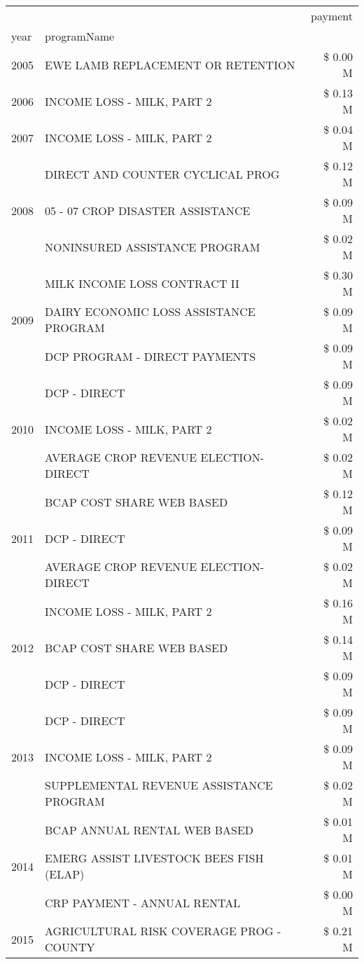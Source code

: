 \begin{tabular}{llr}
\toprule
 &  & payment \\
year & programName &  \\
\midrule
2005 & EWE LAMB REPLACEMENT OR RETENTION & \$ 0.00 M \\
\cline{1-3}
2006 & INCOME LOSS - MILK, PART 2 & \$ 0.13 M \\
\cline{1-3}
2007 & INCOME LOSS - MILK, PART 2 & \$ 0.04 M \\
\cline{1-3}
\multirow[t]{3}{*}{2008} & DIRECT AND COUNTER CYCLICAL PROG & \$ 0.12 M \\
 & 05 - 07 CROP DISASTER ASSISTANCE & \$ 0.09 M \\
 & NONINSURED ASSISTANCE PROGRAM & \$ 0.02 M \\
\cline{1-3}
\multirow[t]{3}{*}{2009} & MILK INCOME LOSS CONTRACT II & \$ 0.30 M \\
 & DAIRY ECONOMIC LOSS ASSISTANCE PROGRAM & \$ 0.09 M \\
 & DCP PROGRAM - DIRECT PAYMENTS & \$ 0.09 M \\
\cline{1-3}
\multirow[t]{3}{*}{2010} & DCP - DIRECT & \$ 0.09 M \\
 & INCOME LOSS - MILK, PART 2 & \$ 0.02 M \\
 & AVERAGE CROP REVENUE ELECTION-DIRECT & \$ 0.02 M \\
\cline{1-3}
\multirow[t]{3}{*}{2011} & BCAP COST SHARE WEB BASED & \$ 0.12 M \\
 & DCP - DIRECT & \$ 0.09 M \\
 & AVERAGE CROP REVENUE ELECTION-DIRECT & \$ 0.02 M \\
\cline{1-3}
\multirow[t]{3}{*}{2012} & INCOME LOSS - MILK, PART 2 & \$ 0.16 M \\
 & BCAP COST SHARE WEB BASED & \$ 0.14 M \\
 & DCP - DIRECT & \$ 0.09 M \\
\cline{1-3}
\multirow[t]{3}{*}{2013} & DCP - DIRECT & \$ 0.09 M \\
 & INCOME LOSS - MILK, PART 2 & \$ 0.09 M \\
 & SUPPLEMENTAL REVENUE ASSISTANCE PROGRAM & \$ 0.02 M \\
\cline{1-3}
\multirow[t]{3}{*}{2014} & BCAP ANNUAL RENTAL WEB BASED & \$ 0.01 M \\
 & EMERG ASSIST LIVESTOCK BEES FISH (ELAP) & \$ 0.01 M \\
 & CRP PAYMENT - ANNUAL RENTAL & \$ 0.00 M \\
\cline{1-3}
\multirow[t]{3}{*}{2015} & AGRICULTURAL RISK COVERAGE PROG - COUNTY & \$ 0.21 M \\

\end{tabular}
